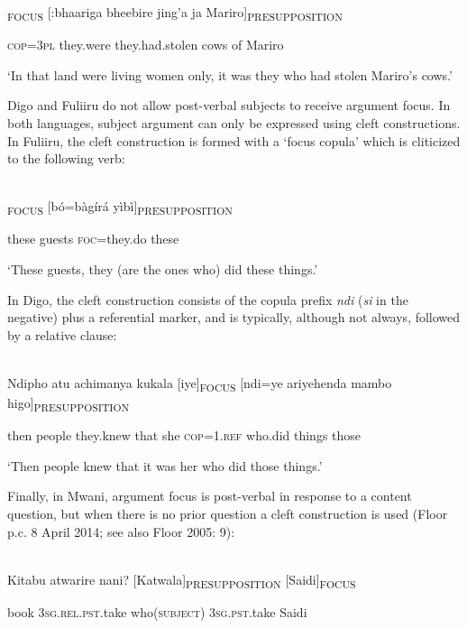 \documentclass[output=paper]{langsci/langscibook}
\begin{document}
\begin{styleLangSciTranslation}
\begin{styleLangSciTranslation}
\begin{styleLangSciTranslation}
\gll [ni=bho]\textsubscript{FOCUS} [:bhaariga bheebire jing’a ja Mariro]\textsubscript{PRESUPPOSITION}\\
\begin{styleUntitledi}
\textsc{cop=3pl} they.were they.had.stolen cows of Mariro
\end{styleUntitledi}

\glt \textup{‘}\textup{In that land were living women only, it was they who had stolen Mariro’s cows.’}
\z

 Digo and Fuliiru do not allow post-verbal subjects to receive argument focus. In both languages, subject argument can only be expressed using cleft constructions. In Fuliiru, the cleft construction is formed with a ‘focus copula’ which is cliticized to the following verb:

\ea\label{ex:}
\\
\textsubscript{FOCUS} [bó=bàgírá yìbì]\textsubscript{PRESUPPOSITION}\\
\begin{styleUntitledi}
these guests \textsc{foc}=they.do these
\end{styleUntitledi}

\glt \textup{‘}\textup{These guests, they (are the ones who) did these things.’}
\z

In Digo, the cleft construction consists of the copula prefix \textit{ndi} (\textit{si} in the negative) plus a referential marker, and is typically, although not always, followed by a relative clause:

\ea\label{ex:}
\\
\gll Ndipho atu achimanya kukala [iye]\textsubscript{FOCUS} [ndi=ye ariyehenda mambo higo]\textsubscript{PRESUPPOSITION}\\
\begin{styleUntitledi}
then people they.knew that she \textsc{cop=1.ref} who\textsc{.}did things those
\end{styleUntitledi}

\glt \textup{‘}\textup{Then people knew that it was her who did those things.’}
\z

Finally, in Mwani, argument focus is post-verbal in response to a content question, but when there is no prior question a cleft construction is used (Floor p.c. 8 April 2014; see also Floor 2005: 9):

\ea\label{ex:}
\\
\gll Kitabu atwarire nani? [Katwala]\textsubscript{PRESUPPOSITION} [Saidi]\textsubscript{FOCUS}\\
\begin{styleUntitledi}
book 3\textsc{sg.rel.pst}.take who(\textsc{subject}) 3\textsc{sg.pst}.take Saidi
\end{styleUntitledi}


\end{styleLangSciTranslation}
\end{styleLangSciTranslation}
\end{styleLangSciTranslation}
\end{document}
